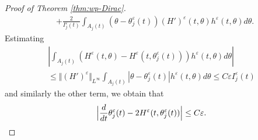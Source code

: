 \documentclass[JEP,XML,SOM,Unicode,NoFloatCountersInSection,published]{cedram}
\theoremstyle{plain}
\theoremstyle{definition}
\newcommand{\nrm}[1]{\Vert#1\Vert}
\let\tht\theta
\let\varep\varepsilon
\begin{document}
\begin{proof}[Proof of Theorem \ref{thm:wp-Dirac}]
\begin{equation*}
\begin{split}
& + \frac{2}{I_{j}^{\varep}(t) }\int_{A_{j}(t)} (\tht - \tht^\varep_j(t))(H')^\varep(t,\tht) h^\varep(t,\tht) d\tht.
\end{split}
\end{equation*}
Estimating
\begin{multline*}
\left| \int_{A_{j}(t)} (H^\varep(t,\tht) - H^\varep(t,\tht_{j}^{\varep}(t))) h^\varep(t,\tht) d\tht\right|\\
\le \nrm{ (H')^\varep }_{L^\infty} \int_{A_{j}(t)} |\tht -\tht_{j}^{\varep}(t) |h^\varep(t,\tht) d\tht \le C\varep I_j^{\varep}(t)
\end{multline*}
and similarly the other term, we obtain that
\begin{equation}\label{eq:ODE-tht-varep}
\Bigl| \frac{d}{dt} \tht_{j}^{\varep}(t) - 2H^{\varep}(t, \tht_{j}^{\varep}(t)) \Bigr| \le C\varep.
\end{equation}


\end{proof}
\end{document}
